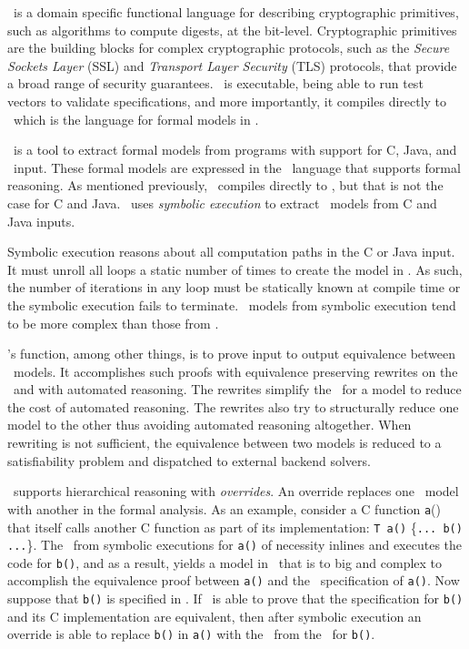 \cryptol\ is a domain specific functional language for describing cryptographic primitives, such as algorithms to compute digests, at the bit-level.
Cryptographic primitives are the building blocks for complex cryptographic protocols, such as the \emph{Secure Sockets Layer} (SSL) and \emph{Transport Layer Security} (TLS) protocols, that provide a broad range of security guarantees.
\cryptol\ is executable, being able to run test vectors to validate specifications, and more importantly, it compiles directly to \sawcore\ which is the language for formal models in \saw.

\saw\ is a tool to extract formal models from programs with support for C, Java, and \cryptol\ input.
These formal models are expressed in the \sawcore\ language that supports formal reasoning.
As mentioned previously, \cryptol\ compiles directly to \sawcore, but that is not the case for C and Java.
\saw\ uses \emph{symbolic execution} to extract \sawcore\ models from C and Java inputs.

Symbolic execution reasons about all computation paths in the C or Java input.
It must unroll all loops a static number of times to create the model in \sawcore.
As such, the number of iterations in any loop must be statically known at compile time or the symbolic execution fails to terminate.
\sawcore\ models from symbolic execution tend to be more complex than those from \cryptol.

\saw's function, among other things, is to prove input to output equivalence between \sawcore\ models.
It accomplishes such proofs with equivalence preserving rewrites on the \sawcore\ and with automated reasoning.
The rewrites simplify the \sawcore\ for a model to reduce the cost of automated reasoning. 
The rewrites also try to structurally reduce one model to the other thus avoiding automated reasoning altogether.
When rewriting is not sufficient, the equivalence between two models is reduced to a satisfiability problem and dispatched to external backend solvers.

\saw\ supports hierarchical reasoning with \emph{overrides}.
An override replaces one \sawcore\ model with another in the formal analysis.
As an example, consider a C function \texttt{a}() that itself calls another C function as part of its implementation: \texttt{T a()} \{\texttt{... b() ...}\}.
The \sawcore\ from symbolic executions for \texttt{a()} of necessity inlines and executes the code for \texttt{b()}, and as a result, yields a model in \sawcore\ that is to big and complex to accomplish the equivalence proof between \texttt{a()} and the \cryptol\ specification of \texttt{a()}.
Now suppose that \texttt{b()} is specified in \cryptol.
If \saw\ is able to prove that the specification for \texttt{b()} and its C implementation are equivalent, then after symbolic execution an override is able to replace \texttt{b()} in \texttt{a()} with the \sawcore\ from the \cryptol\ for \texttt{b()}.

